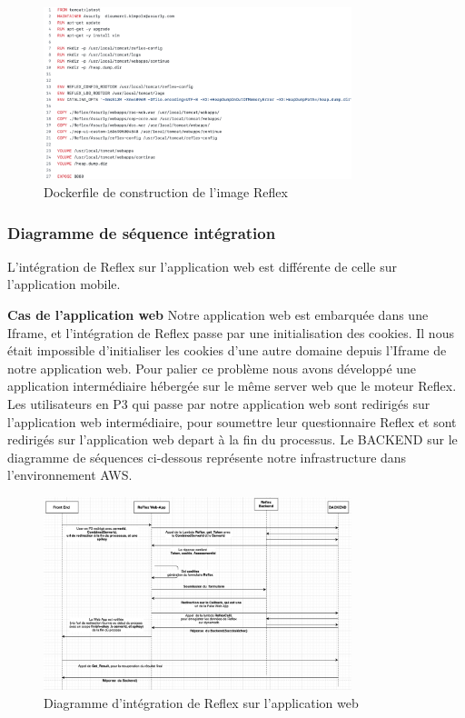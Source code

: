  \begin{figure}[!th]
            \centering
                \includegraphics[width=0.8\textwidth]{Figures/dockerfile}
	       \decoRule
		\caption[Dockerfile de construction de l'image Reflex]{Dockerfile de construction de l'image Reflex}
	\label{fig:Dockerfile de construction de l'image Reflex}
\end{figure}

\subsubsection{Diagramme de séquence intégration}
L'intégration de Reflex sur l'application web est différente de celle sur l'application mobile.

\textbf{Cas de l'application web}
Notre application web est embarquée dans une Iframe, et l'intégration de Reflex passe par une initialisation des cookies. Il nous était impossible d'initialiser les cookies d'une autre domaine depuis l'Iframe de notre application web. Pour palier ce problème nous avons développé une application intermédiaire hébergée sur le même server web que le moteur Reflex. Les utilisateurs en P3 qui passe par notre application web sont redirigés  sur  l'application web intermédiaire, pour soumettre leur questionnaire Reflex et sont redirigés sur l'application web depart à la fin du processus. Le BACKEND sur le diagramme de séquences ci-dessous représente notre infrastructure dans l'environnement AWS.
 \begin{figure}[!th]
            \centering
                \includegraphics[width=0.8\textwidth]{Figures/reflexweb}
	       \decoRule
		\caption[Diagramme d'intégration de Reflex sur l'application web]{Diagramme d'intégration de Reflex sur l'application web}
	\label{fig:Diagramme d'intégration de Reflex sur l'application web}
\end{figure}


